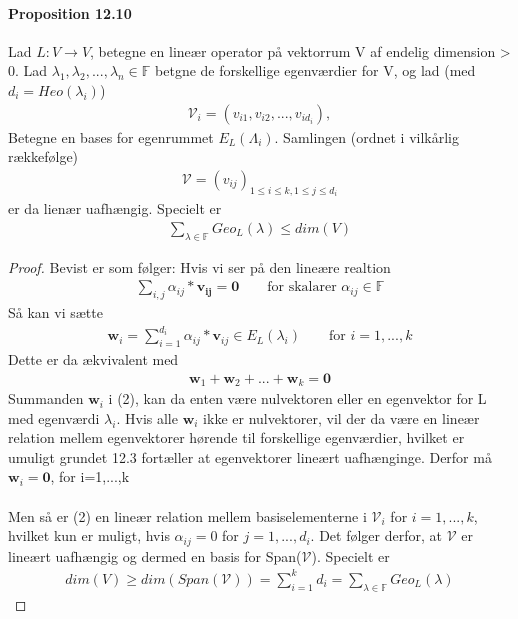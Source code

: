 \documentclass[paper=a4, fontsize=11pt]{scrartcl} %
\begin{document}
			\paragraph{Proposition 12.10} Lad $L:V\rightarrow V$, betegne en lineær operator på vektorrum V af endelig dimension > 0. Lad $\lambda_1,\lambda_2,...,\lambda_n\in\mathbb{F}$ betgne de forskellige egenværdier for V, og lad (med $d_i=Heo(\lambda_i)$)
			\begin{align*}
			\mathcal{V}_i=(v_{i1},v_{i2},...,v_{id_i}),
			\end{align*}
			Betegne en bases for egenrummet $E_L(\Lambda_i)$. Samlingen (ordnet i vilkårlig rækkefølge)
			\begin{align*}
			\mathcal{V}=(v_{ij})_{1\leq i\leq k, 1\leq j \leq d_i}
			\end{align*}
			er da lienær uafhængig. Specielt er 
			\begin{align*}
			\sum_{\lambda\in\mathbb{F}}^{}Geo_L(\lambda)\leq dim(V)
			\end{align*}
			
			\begin{proof}
				
				Bevist er som følger:
				Hvis vi ser på den lineære realtion
				\setcounter{equation}{0}
				\begin{align}
				\sum_{i,j}\alpha_{ij}*\mathbf{v_{ij}}=\mathbf{0} \qquad \text{for skalarer } \alpha_{ij}\in\mathbb{F}
				\end{align}
				Så kan vi sætte
				\begin{align}
				\mathbf{w}_i=\sum_{i=1}^{d_i}\alpha_{ij}*\mathbf{v}_{ij}\in E_L(\lambda_i) \qquad \text{for } i=1,...,k
				\end{align}
				Dette er da ækvivalent med 
				\begin{align}
				\mathbf{w}_1+\mathbf{w}_2+...+\mathbf{w}_k=\mathbf{0}
				\end{align}
				Summanden $\mathbf{w}_i$ i (2), kan da enten være nulvektoren eller en egenvektor for L med egenværdi $\lambda_i$. Hvis alle $\mathbf{w}_i$ ikke er nulvektorer, vil der da være en lineær relation mellem egenvektorer hørende til forskellige egenværdier, hvilket er umuligt grundet 12.3 fortæller at egenvektorer lineært uafhænginge. Derfor må $\mathbf{w}_i=\mathbf{0}$, for i=1,...,k\\ \\
				Men så er (2) en lineær relation mellem basiselementerne i $\mathcal{V}_i$ for $i=1,...,k$, hvilket kun er muligt, hvis $\alpha_{ij}=0$ for $j=1,...,d_i$. Det følger derfor, at $\mathcal{V}$ er lineært uafhængig og dermed en basis for Span($\mathcal{V}$). Specielt er 
				\begin{align*}
				dim(V)\geq dim(Span(\mathcal{V}))=\sum_{i=1}^{k}d_i=\sum_{\lambda\in \mathbb{F}}Geo_L(\lambda)
				\end{align*}
				
				
			\end{proof}
			
\end{document}
